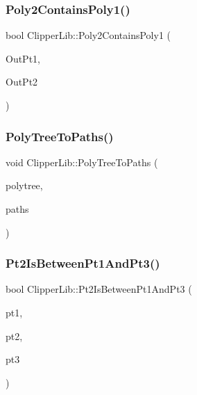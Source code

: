 \mbox{\label{namespace_clipper_lib_a9a24c8b4723d9c93c2d3eabb139c4366}} 
\subsubsection{\texorpdfstring{Poly2ContainsPoly1()}{Poly2ContainsPoly1()}}
{\footnotesize\ttfamily bool Clipper\+Lib\+::\+Poly2\+Contains\+Poly1 (\begin{DoxyParamCaption}\item[{\mbox{\hyperlink{struct_clipper_lib_1_1_out_pt}{Out\+Pt}} $\ast$}]{Out\+Pt1,  }\item[{\mbox{\hyperlink{struct_clipper_lib_1_1_out_pt}{Out\+Pt}} $\ast$}]{Out\+Pt2 }\end{DoxyParamCaption})}

\mbox{\label{namespace_clipper_lib_a3713b024b773e4e041f3de4595ff0f77}} 
\subsubsection{\texorpdfstring{PolyTreeToPaths()}{PolyTreeToPaths()}}
{\footnotesize\ttfamily void Clipper\+Lib\+::\+Poly\+Tree\+To\+Paths (\begin{DoxyParamCaption}\item[{const \mbox{\hyperlink{class_clipper_lib_1_1_poly_tree}{Poly\+Tree}} \&}]{polytree,  }\item[{\mbox{\hyperlink{namespace_clipper_lib_a4bab1d9e10805fa6f1fd3b78c56efcfe}{Paths}} \&}]{paths }\end{DoxyParamCaption})}

\mbox{\label{namespace_clipper_lib_a0a448254ee6419dfde0a539080502d88}} 
\subsubsection{\texorpdfstring{Pt2IsBetweenPt1AndPt3()}{Pt2IsBetweenPt1AndPt3()}}
{\footnotesize\ttfamily bool Clipper\+Lib\+::\+Pt2\+Is\+Between\+Pt1\+And\+Pt3 (\begin{DoxyParamCaption}\item[{const \mbox{\hyperlink{struct_clipper_lib_1_1_int_point}{Int\+Point}}}]{pt1,  }\item[{const \mbox{\hyperlink{struct_clipper_lib_1_1_int_point}{Int\+Point}}}]{pt2,  }\item[{const \mbox{\hyperlink{struct_clipper_lib_1_1_int_point}{Int\+Point}}}]{pt3 }\end{DoxyParamCaption})}

